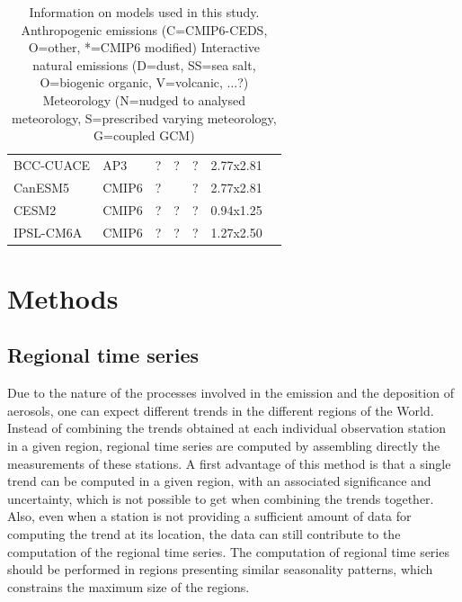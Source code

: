 \documentclass[journal abbreviation, manuscript]{copernicus}
\begin{document}
\begin{table}[]
\begin{tabular}{@{}lllllll@{}}
BCC-CUACE  & AP3       & ?                             & ?                       & ?           & 2.77x2.81                   &                                                                      \\
CanESM5    & CMIP6     & ?                             &                         & ?           & 2.77x2.81                   & \cite{gmd-12-4823-2019}                                             \\
CESM2      & CMIP6     & ?                             & ?                       & ?           & 0.94x1.25                   &                                                                      \\
IPSL-CM6A  & CMIP6     & ?                             & ?                       & ?           & 1.27x2.50                   &                                                                      \\ \bottomrule
\end{tabular}
 \caption{Information on models used in this study. 
  Anthropogenic emissions (C=CMIP6-CEDS, O=other, *=CMIP6 modified)
  Interactive natural emissions (D=dust, SS=sea salt, O=biogenic organic, V=volcanic, ...?)
  Meteorology (N=nudged to analysed meteorology, S=prescribed varying meteorology, G=coupled GCM)
  }
 \label{table:models}
\end{table}



\section{Methods}

\subsection{Regional time series}
Due to the nature of the processes involved in the emission and the deposition of aerosols, one can expect different trends in the different regions of the World. Instead of combining the trends obtained at each individual observation station in a given region, regional time series are computed by assembling directly the measurements of these stations. A first advantage of this method is that a single trend can be computed in a given region, with an associated significance and uncertainty, which is not possible to get when combining the trends together. Also, even when a station is not providing a sufficient amount of data for computing the trend at its location, the data can still contribute to the computation of the regional time series. The computation of regional time series should be performed in regions presenting similar seasonality patterns, which constrains the maximum size of the regions.
\end{document}
